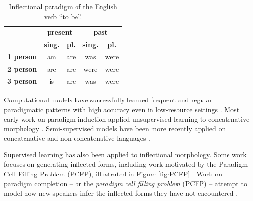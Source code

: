 \begin{table}[tb]
    \begin{center}
    \begin{tabular}{l|c|c|c|c}
      & \multicolumn{2}{c}{\textbf{present}} & \multicolumn{2}{|c}{\textbf{past}} \\
      \cline{2-5}
       & \textbf{sing.}  & \textbf{pl.} & \textbf{sing.}  & \textbf{pl.} \\
       \hline
      \textbf{1 person}  & am & are & was & were \\
      \textbf{2 person} & are & are  & were & were  \\
      \textbf{3 person} & is & are & was & were \\
    \end{tabular}
    \caption[Inflectional paradigm of the English verb ``be'']{Inflectional paradigm of the English verb ``to be''. 
    }
    \label{tab:EngParadigm}
    \end{center}
\end{table}


Computational models have successfully learned frequent and regular paradigmatic patterns with high accuracy even in low-resource settings \citep{hammarstrom_unsupervised_2011,durrett_supervised_2013,ahlberg_semi-supervised_2014}. Most early work on paradigm induction applied unsupervised learning to concatenative morphology \citep{goldsmith_unsupervised_2001,chan_learning_2006,monson_paramorfinding_2007b}. Semi-supervised models have been more recently applied on concatenative and non-concatenative languages \citep{dreyer_discovering_2011,durrett_supervised_2013}. 

Supervised learning has also been applied to inflectional morphology. Some work focuses on generating inflected forms, including work motivated by the Paradigm Cell Filling Problem (PCFP), illustrated in Figure \ref{fig:PCFP} \citep{ackerman2009}. Work on paradigm completion -- or the \textit{paradigm cell filling problem} (PCFP) -- attempt to model how new speakers infer the inflected forms they have not encountered \citep{dreyer_discovering_2011,ahlberg_paradigm_2015,malouf_generating_2016,silfverberg_encoder-decoder_2018}. 


